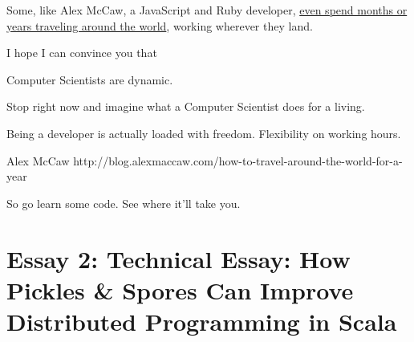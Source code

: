 \documentclass[acmtocl]{acmtrans2m}
\begin{document}
Some, like Alex McCaw, a JavaScript and Ruby developer,
\href{http://alexmaccaw.co.uk/posts/traveling\_writing\_programming}{even
spend months or years traveling around the world}, working wherever they land.

I hope I can convince you that

Computer Scientists are dynamic.

Stop right now and imagine what a Computer Scientist does for a living.

Being a developer is actually loaded with freedom. Flexibility on working hours.

Alex McCaw
http://blog.alexmaccaw.com/how-to-travel-around-the-world-for-a-year



So go learn some code. See where it'll take you.




\section*{\textbf{Essay 2:} Technical Essay: How Pickles \& Spores Can Improve Distributed Programming in Scala}



\end{document}
